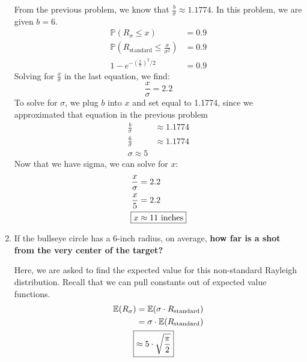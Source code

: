 \documentclass[titlepage, 12pt, leqno]{article}
\begin{document}
\begin{ex}
\begin{enumerate}
            From the previous problem, we know that $\frac{b}{\sigma} \approx 1.1774$. In
            this problem, we are given $b=6$.
            \begin{align*}
                \mathbb{P}(R_\sigma \le x) &= 0.9 \\
                \mathbb{P}(R_\text{standard} \le \frac{x}{\sigma^2}) &= 0.9 \\
                1 - e^{-\left(\frac{x}{\sigma}\right)^2/2} &= 0.9
            \end{align*}
            Solving for $\frac{x}{\sigma}$ in the last equation, we find:
            \[
                \frac{x}{\sigma} = 2.2
            \]
            To solve for $\sigma$, we plug $b$ into $x$ and set equal to 1.1774, since we
            approximated that equation in the previous problem
            \begin{align*}
                \frac{b}{\sigma} &\approx 1.1774 \\
                \frac{6}{\sigma} &\approx 1.1774 \\
                \sigma \approx 5
            \end{align*}
            Now that we have sigma, we can solve for $x$:
            \begin{align*}
                \frac{x}{\sigma} &= 2.2 \\
                \frac{x}{5} &= 2.2 \\
                \Aboxed{x &\approx 11 \text{ inches}} 
            \end{align*}

        \item If the bullseye circle has a 6-inch radius, on average, \textbf{how far is
            a shot from the very center of the target?}
            \vspace{10px}
            
            Here, we are asked to find the expected value for this non-standard Rayleigh
            distribution. Recall that we can pull constants out of expected value 
            functions.
            \begin{align*}
                \mathbb{E}(R_\sigma) &= \mathbb{E}(\sigma\cdot R_\text{standard}) \\
                                     &= \sigma \cdot \mathbb{E}(R_\text{standard}) \\
                \Aboxed{&\approx 5 \cdot \sqrt{\frac{\pi }{2}}} 
            \end{align*}
    \end{enumerate}
\end{ex}
\end{document}
